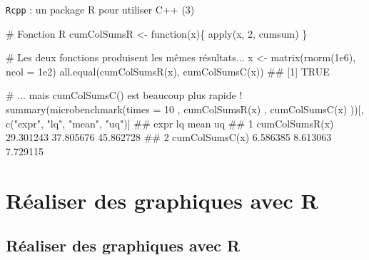 \documentclass[12pt,ignorenonframetext,handout,]{beamer}
\newenvironment{Shaded}{}{}
\newcommand{\CommentTok}[1]{\textcolor[rgb]{0.00,0.50,0.00}{#1}}
\newcommand{\ControlFlowTok}[1]{\textcolor[rgb]{0.00,0.00,1.00}{#1}}
\newcommand{\DataTypeTok}[1]{#1}
\newcommand{\DecValTok}[1]{#1}
\newcommand{\FloatTok}[1]{#1}
\newcommand{\KeywordTok}[1]{\textcolor[rgb]{0.00,0.00,1.00}{#1}}
\newcommand{\NormalTok}[1]{#1}
\newcommand{\StringTok}[1]{\textcolor[rgb]{0.00,0.50,0.50}{#1}}
\renewenvironment{Shaded}{\begin{snugshade}}{\end{snugshade}}
\begin{document}
\begin{frame}[fragile]{\texttt{Rcpp} : un package R pour utiliser C++
(3)}
\protect\hypertarget{rcpp-un-package-r-pour-utiliser-c-3}{}

\footnotesize

\begin{Shaded}
\begin{Highlighting}[]
\CommentTok{# Fonction R}
\NormalTok{cumColSumsR <-}\StringTok{ }\ControlFlowTok{function}\NormalTok{(x)\{}
  \KeywordTok{apply}\NormalTok{(x, }\DecValTok{2}\NormalTok{, cumsum)}
\NormalTok{\}}

\CommentTok{# Les deux fonctions produisent les mêmes résultats...}
\NormalTok{x <-}\StringTok{ }\KeywordTok{matrix}\NormalTok{(}\KeywordTok{rnorm}\NormalTok{(}\FloatTok{1e6}\NormalTok{), }\DataTypeTok{ncol =} \FloatTok{1e2}\NormalTok{)}
\KeywordTok{all.equal}\NormalTok{(}\KeywordTok{cumColSumsR}\NormalTok{(x), }\KeywordTok{cumColSumsC}\NormalTok{(x))}
\NormalTok{  ## [1] TRUE}

\CommentTok{# ... mais cumColSumsC() est beaucoup plus rapide !}
\KeywordTok{summary}\NormalTok{(}\KeywordTok{microbenchmark}\NormalTok{(}\DataTypeTok{times =} \DecValTok{10}
\NormalTok{  , }\KeywordTok{cumColSumsR}\NormalTok{(x)}
\NormalTok{  , }\KeywordTok{cumColSumsC}\NormalTok{(x)}
\NormalTok{))[, }\KeywordTok{c}\NormalTok{(}\StringTok{"expr"}\NormalTok{, }\StringTok{"lq"}\NormalTok{, }\StringTok{"mean"}\NormalTok{, }\StringTok{"uq"}\NormalTok{)]}
\NormalTok{  ##             expr        lq      mean        uq}
\NormalTok{  ## 1 cumColSumsR(x) 29.301243 37.805676 45.862728}
\NormalTok{  ## 2 cumColSumsC(x)  6.586385  8.613063  7.729115}
\end{Highlighting}
\end{Shaded}

\end{frame}

\hypertarget{realiser-des-graphiques-avec-r}{%
\section{Réaliser des graphiques avec
R}\label{realiser-des-graphiques-avec-r}}

\subsection*{Réaliser des graphiques avec R}
\end{document}
